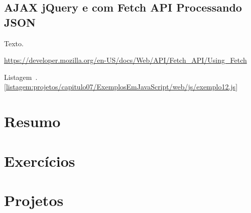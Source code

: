 \subsection{AJAX jQuery e com Fetch API Processando JSON}

Texto.

\url{https://developer.mozilla.org/en-US/docs/Web/API/Fetch_API/Using_Fetch}

Listagem~\thechapter.\ref{listagem:projetos/capitulo07/ExemplosEmJavaScript/web/js/exemplo12.js}



\section{Resumo}


\section{Exercícios}


\section{Projetos}
